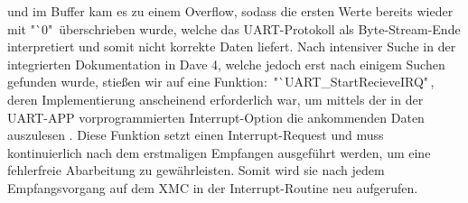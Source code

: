 \documentclass[12pt,a4paper,bibliography=totoc,listof=totoc]{scrartcl}
\begin{document}
und im Buffer kam es zu einem Overflow, sodass die ersten Werte bereits wieder mit "`0"\, überschrieben wurde, 
welche das UART-Protokoll als Byte-Stream-Ende interpretiert und somit nicht korrekte Daten liefert.
Nach intensiver Suche in der integrierten Dokumentation in Dave 4, welche jedoch erst nach einigem Suchen 
gefunden wurde, stießen wir auf eine Funktion:\, "`UART\_StartRecieveIRQ"\,, deren Implementierung anscheinend 
erforderlich war, um mittels der in der UART-APP vorprogrammierten Interrupt-Option die ankommenden Daten 
auszulesen \cite {infineon}
. Diese Funktion setzt einen Interrupt-Request und muss 
kontinuierlich nach dem erstmaligen Empfangen ausgeführt werden, um eine fehlerfreie Abarbeitung zu 
gewährleisten. Somit wird sie nach jedem Empfangsvorgang auf dem XMC in der Interrupt-Routine neu 
aufgerufen.
\end{document}
